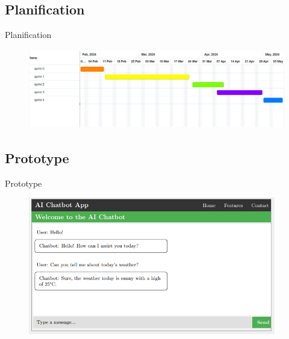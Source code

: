 \subsection{Planification}
\begin{frame}{Planification}

    \begin{figure}[H]
        \centering
        \includegraphics[height=3.5cm]{assets/images/gant-prev.png}
    \end{figure}
\end{frame}




\subsection{Prototype}
\begin{frame}{Prototype}

    \begin{figure}[H]
        \centering
        \includegraphics[height=6cm]{assets/images/prototype.png}
    \end{figure}

\end{frame}
